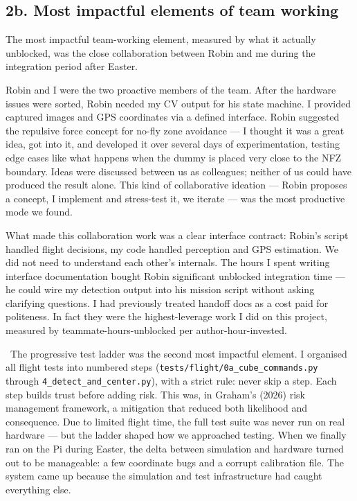 
\subsection{2b. Most impactful elements of team working}

The most impactful team-working element, measured by what it actually unblocked, was the close collaboration between Robin and me during the integration period after Easter.

Robin and I were the two proactive members of the team. After the hardware issues were sorted, Robin needed my CV output for his state machine. I provided captured images and GPS coordinates via a defined interface. Robin suggested the repulsive force concept for no-fly zone avoidance --- I thought it was a great idea, got into it, and developed it over several days of experimentation, testing edge cases like what happens when the dummy is placed very close to the NFZ boundary. Ideas were discussed between us as colleagues; neither of us could have produced the result alone. This kind of collaborative ideation --- Robin proposes a concept, I implement and stress-test it, we iterate --- was the most productive mode we found.

What made this collaboration work was a clear interface contract: Robin's script handled flight decisions, my code handled perception and GPS estimation. We did not need to understand each other's internals. The hours I spent writing interface documentation bought Robin significant unblocked integration time --- he could wire my detection output into his mission script without asking clarifying questions. I had previously treated handoff docs as a cost paid for politeness. In fact they were the highest-leverage work I did on this project, measured by teammate-hours-unblocked per author-hour-invested.

\www\ The progressive test ladder was the second most impactful element. I organised all flight tests into numbered steps (\texttt{tests/flight/0a\_cube\_commands.py} through \texttt{4\_detect\_and\_center.py}), with a strict rule: never skip a step. Each step builds trust before adding risk. This was, in Graham's (2026) risk management framework, a mitigation that reduced both likelihood and consequence. Due to limited flight time, the full test suite was never run on real hardware --- but the ladder shaped how we approached testing. When we finally ran on the Pi during Easter, the delta between simulation and hardware turned out to be manageable: a few coordinate bugs and a corrupt calibration file. The system came up because the simulation and test infrastructure had caught everything else.

